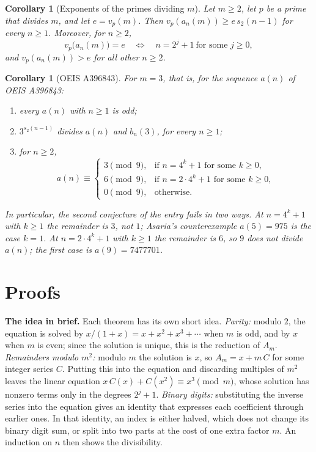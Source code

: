 \documentclass[11pt,a4paper]{article}
\newtheorem{corollary}[theorem]{Corollary}
\theoremstyle{definition}
\theoremstyle{remark}
\newcommand{\para}[1]{\par\medskip\noindent\textbf{#1}\enspace}
\begin{document}
\begin{corollary}[Exponents of the primes dividing $m$]\label{cor:val}
Let $m\ge2$, let $p$ be a prime that divides $m$, and let $e=v_p(m)$. Then $v_p(a_n(m))\ge e\,s_2(n-1)$ for every
$n\ge1$. Moreover, for $n\ge2$,
\[
v_p\bigl(a_n(m)\bigr)=e\quad\Longleftrightarrow\quad n=2^j+1\ \text{for some }j\ge0,
\]
and $v_p(a_n(m))>e$ for all other $n\ge2$.
\end{corollary}

\begin{corollary}[OEIS A396843]\label{cor:entry}
For $m=3$, that is, for the sequence $a(n)$ of OEIS A396843:
\begin{enumerate}[label=(\alph*)]
\item every $a(n)$ with $n\ge1$ is odd;
\item $3^{s_2(n-1)}$ divides $a(n)$ and $b_n(3)$, for every $n\ge1$;
\item for $n\ge2$,
\[
a(n)\equiv\begin{cases}3\pmod9,&\text{if }n=4^k+1\text{ for some }k\ge0,\\
6\pmod9,&\text{if }n=2\cdot4^k+1\text{ for some }k\ge0,\\
0\pmod9,&\text{otherwise.}\end{cases}
\]
\end{enumerate}
In particular, the second conjecture of the entry fails in two ways. At $n=4^k+1$ with $k\ge1$ the remainder is $3$,
not $1$; Asaria's counterexample $a(5)=975$ is the case $k=1$. At $n=2\cdot4^k+1$ with $k\ge1$ the remainder is $6$, so
$9$ does not divide $a(n)$; the first case is $a(9)=7477701$.
\end{corollary}

\section{Proofs}\label{sec:proofs}

\para{The idea in brief.} Each theorem has its own short idea.
\emph{Parity:} modulo $2$, the equation is solved by $x/(1+x)=x+x^2+x^3+\cdots$ when $m$ is odd, and by $x$ when $m$ is
even; since the solution is unique, this is the reduction of $A_m$.
\emph{Remainders modulo $m^2$:} modulo $m$ the solution is $x$, so $A_m=x+m\,C$ for some integer series $C$.
Putting this into the equation and discarding multiples of $m^2$ leaves the linear equation
$x\,C(x)+C(x^2)\equiv x^3\pmod m$, whose solution has nonzero terms only in the degrees $2^j+1$.
\emph{Binary digits:} substituting the inverse series into the equation gives an identity that expresses each
coefficient through earlier ones. In that identity, an index is either halved, which does not change its binary digit
sum, or split into two parts at the cost of one extra factor $m$. An induction on $n$ then shows the divisibility.
\end{document}
